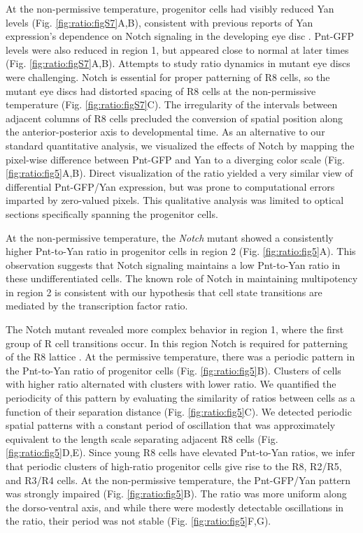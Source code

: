 At the non-permissive temperature, progenitor cells had visibly reduced Yan levels (Fig. \ref{fig:ratio:figS7}A,B), consistent with previous reports of Yan expression's dependence on Notch signaling in the developing eye disc \cite{Rohrbaugh2002}. Pnt-GFP levels were also reduced in region 1, but appeared close to normal at later times (Fig. \ref{fig:ratio:figS7}A,B). Attempts to study ratio dynamics in mutant eye discs were challenging. Notch is essential for proper patterning of R8 cells, so the mutant eye discs had distorted spacing of R8 cells at the non-permissive temperature (Fig. \ref{fig:ratio:figS7}C). The irregularity of the intervals between adjacent columns of R8 cells precluded the conversion of spatial position along the anterior-posterior axis to developmental time. As an alternative to our standard quantitative analysis, we visualized the effects of Notch by mapping the pixel-wise difference between Pnt-GFP and Yan to a diverging color scale (Fig. \ref{fig:ratio:fig5}A,B). Direct visualization of the ratio yielded a very similar view of differential Pnt-GFP/Yan expression, but was prone to computational errors imparted by zero-valued pixels. This qualitative analysis was limited to optical sections specifically spanning the progenitor cells.

At the non-permissive temperature, the \textit{Notch} mutant showed a consistently higher Pnt-to-Yan ratio in progenitor cells in region 2 (Fig. \ref{fig:ratio:fig5}A). This observation suggests that Notch signaling maintains a low Pnt-to-Yan ratio in these undifferentiated cells. The known role of Notch in maintaining multipotency in region 2 \cite{Fortini1993} is consistent with our hypothesis that cell state transitions are mediated by the transcription factor ratio.

The Notch mutant revealed more complex behavior in region 1, where the first group of R cell transitions occur. In this region Notch is required for patterning of the R8 lattice \cite{Lubensky2011}. At the permissive temperature, there was a periodic pattern in the Pnt-to-Yan ratio of progenitor cells (Fig. \ref{fig:ratio:fig5}B). Clusters of cells with higher ratio alternated with clusters with lower ratio. We quantified the periodicity of this pattern by evaluating the similarity of ratios between cells as a function of their separation distance (Fig. \ref{fig:ratio:fig5}C). We detected periodic spatial patterns with a constant period of oscillation that was approximately equivalent to the length scale separating adjacent R8 cells (Fig. \ref{fig:ratio:fig5}D,E). Since young R8 cells have elevated Pnt-to-Yan ratios, we infer that periodic clusters of high-ratio progenitor cells give rise to the R8, R2/R5, and R3/R4 cells. At the non-permissive temperature, the Pnt-GFP/Yan pattern was strongly impaired (Fig. \ref{fig:ratio:fig5}B). The ratio was more uniform along the dorso-ventral axis, and while there were modestly detectable oscillations in the ratio, their period was not stable (Fig. \ref{fig:ratio:fig5}F,G).

